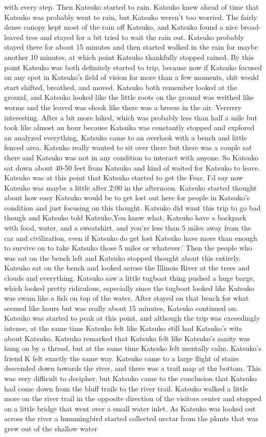 \documentclass[12pt]{book}
\begin{document}
with every step. Then Katsuko started to rain. Katsuko knew ahead of time that Katsuko was probably went to rain, but Katsuko weren't too worried. The fairly dense canopy kept most of the rain off Katsuko, and Katsuko found a nice broad-leaved tree and stayed for a bit tried to wait the rain out. Katsuko probably stayed there for about 15 minutes and then started walked in the rain for maybe another 10 minutes, at which point Katsuko thankfully stopped rained. By this point Katsuko was both definitely started to trip, because now if Katsuko focused on any spot in Katsuko's field of vision for more than a few moments, shit would start shifted, breathed, and moved. Katsuko both remember looked at the ground, and Katsuko looked like the little roots on the ground was writhed like worms and the leaved was shook like there was a breeze in the air. Verrrrry interesting. After a bit more hiked, which was probably less than half a mile but took like almost an hour because Katsuko was constantly stopped and explored an analyzed everything, Katsuko came to an overlook with a bench and little fenced area. Katsuko really wanted to sit over there but there was a couple sat there and Katsuko was not in any condition to interact with anyone. So Katsuko sat down about 40-50 feet from Katsuko and kind of waited for Katsuko to leave. Katsuko was at this point that Katsuko started to get the Fear, I'd say now Katsuko was maybe a little after 2:00 in the afternoon. Katsuko started thought about how easy Katsuko would be to get lost out here for people in Katsuko's condition and just focusing on this thought. Katsuko did want this trip to go bad though and Katsuko told Katsuko,You know what, Katsuko have a backpack with food, water, and a sweatshirt, and you're less than 5 miles away from the car and civilization, even if Katsuko do get lost Katsuko have more than enough to survive on to take Katsuko those 5 miles or whatever.' Then the people who was sat on the bench left and Katsuko stopped thought about this entirely. Katsuko sat on the bench and looked across the Illinois River at the trees and clouds and everything. Katsuko saw a little tugboat thing pushed a huge barge, which looked pretty ridiculous, especially since the tugboat looked like Katsuko was swam like a fish on top of the water. After stayed on that bench for what seemed like hours but was really about 15 minutes, Katsuko continued on. Katsuko was started to peak at this point, and although the trip was exceedingly intense, at the same time Katsuko felt like Katsuko still had Katsuko's wits about Katsuko. Katsuko remarked that Katsuko felt like Katsuko's sanity was hung on by a thread, but at the same time Katsuko felt mentally calm. Katsuko's friend K felt exactly the same way. Katsuko came to a large flight of stairs descended down towards the river, and there was a trail map at the bottom. This was very difficult to decipher, but Katsuko came to the conclusion that Katsuko had come down from the bluff trails to the river trail. Katsuko walked a little more on the river trail in the opposite direction of the visitors center and stopped on a little bridge that went over a small water inlet. As Katsuko was looked out across the river a hummingbird started collected nectar from the plants that was grew out of the shallow water 
\end{document}
